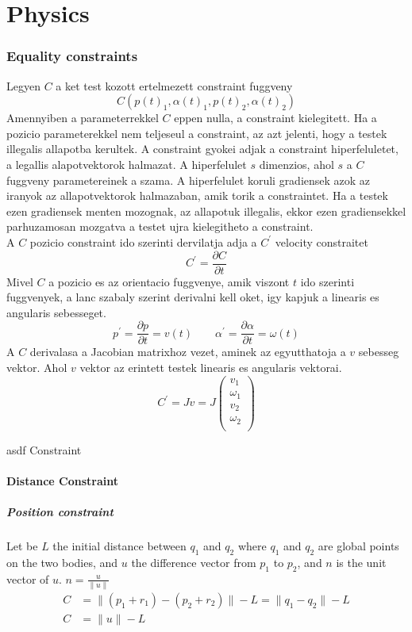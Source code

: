\documentclass{article}
\author{Dani}
\begin{document}
	\part{Physics}
	\section{Equality constraints}
	
	Legyen $C$ a ket test kozott ertelmezett constraint fuggveny
	$$
		C(p(t)_1, \alpha(t)_1, p(t)_2, \alpha(t)_2)
	$$
	Amennyiben a parameterrekkel $C$ eppen nulla, a constraint kielegitett. Ha a pozicio parameterekkel nem teljeseul a constraint, az azt jelenti, hogy a testek illegalis allapotba kerultek.
	A constraint gyokei adjak a constraint hiperfeluletet, a legallis alapotvektorok halmazat. A hiperfelulet $s$ dimenzios, ahol $s$ a $C$ fuggveny parametereinek a szama. A hiperfelulet koruli gradiensek azok az iranyok az allapotvektorok halmazaban, amik torik a constraintet. Ha a testek ezen gradiensek menten mozognak, az allapotuk illegalis, ekkor ezen gradiensekkel parhuzamosan mozgatva a testet ujra kielegitheto a constraint.
	$$ $$
	A $C$ pozicio constraint ido szerinti dervilatja adja a $C^{'}$ velocity constraitet
	$$
		C^{'}=\frac{\partial C}{\partial t}
	$$
	Mivel $C$ a pozicio es az orientacio fuggvenye, amik viszont $t$ ido szerinti fuggvenyek, a lanc szabaly szerint derivalni kell oket, igy kapjuk a linearis es angularis sebesseget.
	$$
		p^{'}=\frac{\partial p}{\partial t}=v(t)
		\qquad 
		\alpha^{'}=\frac{\partial\alpha}{\partial t}=\omega(t)
	$$
	A $C$ derivalasa a Jacobian matrixhoz vezet, aminek az egyutthatoja a $v$ sebesseg vektor. Ahol $v$ vektor az erintett testek linearis es angularis vektorai.
	$$
		C^{'}=Jv=J
		\begin{pmatrix}
			v_1\\
			\omega_1\\
			v_2\\
			\omega_2\\
		\end{pmatrix}
	$$
	
	$$ $$
	asdf
	Constraint
	\newpage
	\subsection{Distance Constraint}
	\subsubsection{Position constraint}
	Let be $L$ the initial distance between $q_1$ and $q_2$ where $q_1$ and $q_2$ are global points on the two bodies, and $u$ the difference vector from $p_1$ to $p_2$, and $n$ is the unit vector of $u$. $n=\frac{u}{\|u\|}$
	\begin{align}
		C &= \|(p_1+r_1) - (p_2+r_2)\|-L = \|q_1 - q_2\|-L\\
		C &= \|u\|-L
	\end{align}
\end{document}
